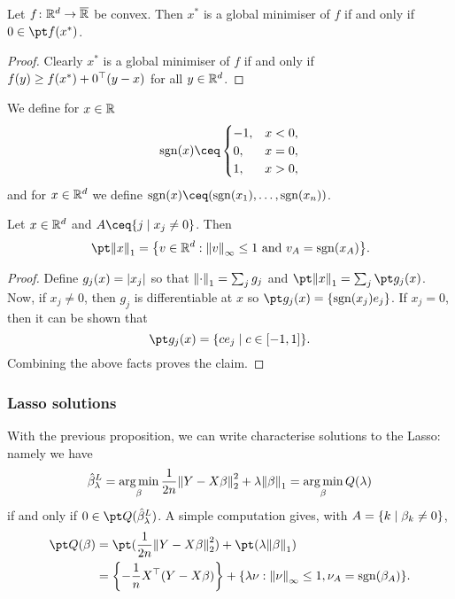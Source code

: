 \begin{proposition}
	Let $f \colon \mathbb R^d \to \overline{\mathbb R}$ be convex. Then $x^*$ is a global minimiser of $f$ if and only if $0 \in \pt f(x^*)$. 
\end{proposition}

\begin{proof}
	Clearly $x^*$ is a global minimiser of $f$ if and only if $f(y) \geq f(x^*) + 0^\top (y - x)$ for all $y \in \mathbb R^d$. 
\end{proof}

We define for $x \in \mathbb R$
\[
\sign(x) \ceq\begin{cases}
	-1, &x<0,\\ 0, &x=0, \\ 1, &x>0,
\end{cases}
\]
and for $x \in \mathbb R^d$ we define $\sign(x) \ceq (\sign(x_1), \dotsc, \sign(x_n))$. 

\begin{proposition}
	Let $x \in \mathbb R^d$ and $A \ceq \qty{j \mid x_j \neq 0}$. Then
	\[
	\pt \norm{x}_1 = \qty{v \in \RR^d : \norm{v}_\infty \leq 1 \text{ and } v_A = \sign(x_A)}. 
	\]
\end{proposition}

\begin{proof}
	Define $g_j(x) = \abs{x_j}$ so that $\norm{\cdot}_1 = \sum_j g_j$ and $\pt \norm{x}_1 = \sum_j \pt g_j(x)$. Now, if $x_j \neq 0$, then $g_j$ is differentiable at $x$ so $\pt g_j(x) = \qty{\sign(x_j) e_j}$. If $x_j = 0$, then it can be shown that
	\[
	\pt g_j(x) = \qty{c e_j \mid c \in [-1, 1]}.
	\]
	Combining the above facts proves the claim. 
\end{proof}

\subsubsection{Lasso solutions}

With the previous proposition, we can write characterise solutions to the Lasso: namely we have
\[
\hat\beta_\lambda^L = \operatorname*{arg\,min}_\beta \frac1{2n} \norm{Y- X\beta}_2^2 + \lambda \norm{\beta}_1 = \operatorname*{arg\,min}_\beta Q(\lambda)
\]
if and only if $0 \in \pt Q(\hat \beta_\lambda^L)$. A simple computation gives, with $A = \qty{k \mid \beta_k \neq 0}$, 
\begin{align*}
\pt Q(\beta) &= \pt(\frac1{2n} \norm{Y- X\beta}_2^2) + \pt(\lambda \norm{\beta}_1) \\
&= \qty{-\frac1n X\T(Y - X\beta)} + \qty{\lambda \nu : \norm{\nu}_\infty \leq 1, \nu_A = \sign(\beta_A)}. 
\end{align*}

